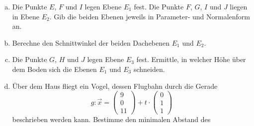 \begin{exercise}
\begin{center}
    \end{center}
    \begin{enumerate}[a)]
      \item Die Punkte $E$, $F$ und $I$ legen Ebene $E_{1}$ fest.
            Die Punkte $F$, $G$, $I$ und $J$ liegen in Ebene $E_{2}$.
            Gib die beiden Ebenen jeweils in Parameter- und Normalenform an.
      \item Berechne den Schnittwinkel der beiden Dachebenen $E_{1}$ und $E_{2}$.
      \item Die Punkte $G$, $H$ und $J$ legen Ebene $E_{3}$ fest.
            Ermittle, in welcher Höhe über dem Boden sich die Ebenen
            $E_{1}$ und $E_{3}$ schneiden.
      \item Über dem Haus fliegt ein Vogel, dessen Flugbahn durch die Gerade
            \begin{equation*}
              g:\vec{x}=
              \begin{pmatrix} 9 \\ 0 \\ 11 \end{pmatrix}
              +t\cdot
              \begin{pmatrix} 0 \\ 1 \\ 1 \end{pmatrix}
            \end{equation*}
            beschrieben werden kann. Bestimme den minimalen Abstand des

\end{enumerate}
\end{exercise}
